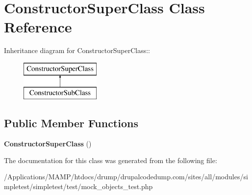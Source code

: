 \hypertarget{class_constructor_super_class}{
\section{ConstructorSuperClass Class Reference}
\label{class_constructor_super_class}
}
Inheritance diagram for ConstructorSuperClass::\begin{figure}[H]
\begin{center}
\leavevmode
\includegraphics[height=2cm]{class_constructor_super_class}
\end{center}
\end{figure}
\subsection*{Public Member Functions}
\begin{DoxyCompactItemize}
\item 
\hypertarget{class_constructor_super_class_ac0190257a61adbac9a065d206a7e2416}{
{\bfseries ConstructorSuperClass} ()}
\label{class_constructor_super_class_ac0190257a61adbac9a065d206a7e2416}

\end{DoxyCompactItemize}


The documentation for this class was generated from the following file:\begin{DoxyCompactItemize}
\item 
/Applications/MAMP/htdocs/drump/drupalcodedump.com/sites/all/modules/simpletest/simpletest/test/mock\_\-objects\_\-test.php\end{DoxyCompactItemize}
